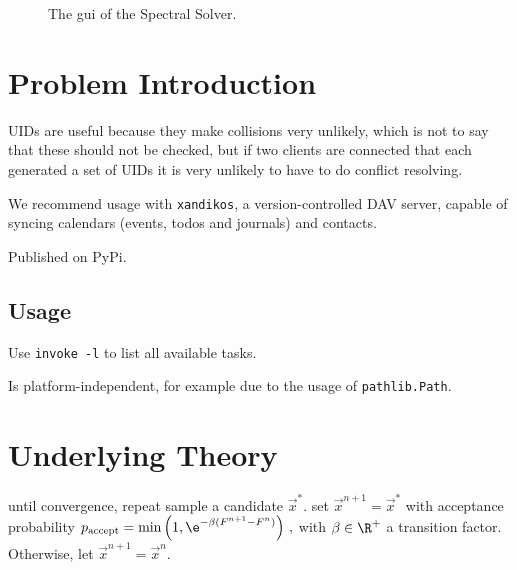 \documentclass{prettytex/ox/mmsc-special-topic}
\title{\topictitle}
\author{Candidate \candidatenumber}
\date{\today}
\begin{document}
  \pagestyle{plain}
  \mmscSpecialHeader

  \begin{abstract}
    \label{abstract}
    In this project report we will review the central concepts utilised in the group work conducted to make progress in the \gls{pde} problem associated with the electrochemical model of a battery cell and present numerical results.
    \vspace*{0.2cm}

    \noindent
    \textbf{Our Goal:}
    Numerically obtain the solution $\{a(x, T), b(x, T)\}$.

    The Finite Difference schemes are implemented in Julia and Python, whereas the Spectral Method is implemented in C++.
  \end{abstract}

  \begin{figure}[H]
    \centering
    \caption{The \gls{gui} of the Spectral Solver.}
    \label{fig:gui}
  \end{figure}

  \pagebreak
  \pagestyle{normal}

  \section{Problem Introduction}
  \label{sec:introduction}

  UIDs are useful because they make collisions very unlikely, which is not to say that these should not be checked, but if two clients are connected that each generated a set of UIDs it is very unlikely to have to do conflict resolving.

  We recommend usage with \texttt{xandikos}, a version-controlled DAV server, capable of syncing calendars (events, todos and journals) and contacts.

  Published on PyPi.

  \subsection{Usage}
  Use \texttt{invoke -l} to list all available tasks.

  Is platform-independent, for example due to the usage of \texttt{pathlib.Path}.

  \section{Underlying Theory}
  \begin{algorithm}[language=pseudo,caption={\centering The Metropolis-Hastings algorithm \parencite{metropolis, hastings}},basicstyle=\footnotesize]
until convergence, repeat
  sample a candidate $\vec{x}^*$.
  set $\vec{x}^{n+1} = \vec{x}^*$ with acceptance probability
    $p_{\rm accept} = \min\left(1, \e^{-\beta (F^{n+1} - F^n)}\right)\,,$ with $\beta \in \R^+$ a transition factor.
  Otherwise, let $\vec{x}^{n+1} = \vec{x}^{n}$.
  \end{algorithm}
\end{document}
